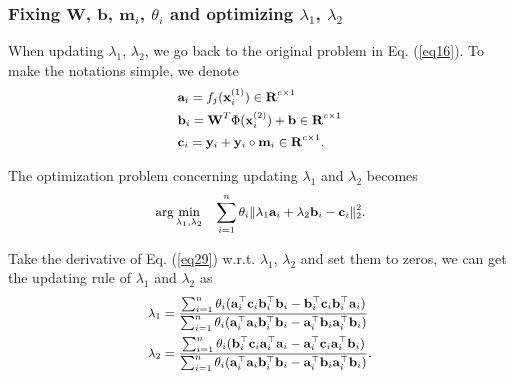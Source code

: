 \documentclass[10pt,journal,compsoc]{IEEEtran}
\begin{document}
\subsubsection{Fixing $\mathbf{W}$, $\mathbf{b}$, $\mathbf{m}_i$, $\theta_i$ and optimizing $\lambda_1$, $\lambda_2$}

When updating $\lambda_1$, $\lambda_2$, we go back to the original problem in Eq. (\ref{eq16}). To make the notations simple, we denote
\begin{equation}
\label{eq28}
\small{
\begin{split}
& \mathbf{a}_i = f_j(\mathbf{x}_i^{(1)}) \in \mathbf{R}^{c\times1} \\
& \mathbf{b}_i = \mathbf{W}^T \Phi(\mathbf{x}_i^{(2)})+\mathbf{b} \in \mathbf{R}^{c\times1}\\
& \mathbf{c}_i =  \mathbf{y}_i+\mathbf{y}_i \circ \mathbf{m}_i \in \mathbf{R}^{c\times1}.
\end{split}}
\end{equation}

The optimization problem concerning updating $\lambda_1$ and $\lambda_2$ becomes
\begin{equation}
\label{eq29}
\small{
\begin{split}
& \arg \min_{\lambda_1,\lambda_2}
& \sum_{i=1}^n \theta _i \| \lambda_1 \mathbf{a}_i +\lambda_2 \mathbf{b}_i - \mathbf{c}_i\|_2^2.
\end{split}}
\end{equation}

Take the derivative of Eq. (\ref{eq29}) w.r.t. $\lambda_1$, $\lambda_2$ and set them to zeros, we can get the updating rule of $\lambda_1$ and $\lambda_2$ as
\begin{equation}
\label{eq30}
\small{
\begin{split}
& \lambda_1 = \frac{\sum_{i=1}^n \theta_i (\mathbf{a}_i^\top \mathbf{c}_i \mathbf{b}_i^\top \mathbf{b}_i-\mathbf{b}_i^\top \mathbf{c}_i \mathbf{b}_i^\top \mathbf{a}_i)}
{\sum_{i=1}^n \theta_i (\mathbf{a}_i^\top \mathbf{a}_i \mathbf{b}_i^\top \mathbf{b}_i-\mathbf{a}_i^\top \mathbf{b}_i \mathbf{a}_i^\top \mathbf{b}_i)} \\
& \lambda_2 = \frac{\sum_{i=1}^n \theta_i (\mathbf{b}_i^\top \mathbf{c}_i \mathbf{a}_i^\top \mathbf{a}_i-\mathbf{a}_i^\top \mathbf{c}_i \mathbf{a}_i^\top \mathbf{b}_i)}
{\sum_{i=1}^n \theta_i (\mathbf{a}_i^\top \mathbf{a}_i \mathbf{b}_i^\top \mathbf{b}_i-\mathbf{a}_i^\top \mathbf{b}_i \mathbf{a}_i^\top \mathbf{b}_i)}.
\end{split}}
\end{equation}
\end{document}

